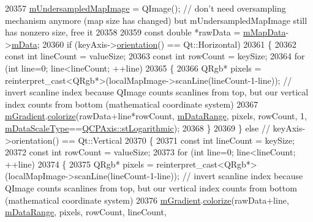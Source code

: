 \begin{DoxyCode}
20357     \hyperlink{class_q_c_p_color_map_acad3d52f3572436d5f2e4057911ea8d3}{mUndersampledMapImage} = QImage(); \textcolor{comment}{// don't need oversampling mechanism anymore
       (map size has changed) but mUndersampledMapImage still has nonzero size, free it}
20358   
20359   \textcolor{keyword}{const} \textcolor{keywordtype}{double} *rawData = \hyperlink{class_q_c_p_color_map_a8709272aa8f0be3ca111bf3866806f8b}{mMapData}->\hyperlink{class_q_c_p_color_map_data_ac1682862022f575191351c9825187d39}{mData};
20360   \textcolor{keywordflow}{if} (keyAxis->\hyperlink{class_q_c_p_axis_a57483f2f60145ddc9e63f3af53959265}{orientation}() == Qt::Horizontal)
20361   \{
20362     \textcolor{keyword}{const} \textcolor{keywordtype}{int} lineCount = valueSize;
20363     \textcolor{keyword}{const} \textcolor{keywordtype}{int} rowCount = keySize;
20364     \textcolor{keywordflow}{for} (\textcolor{keywordtype}{int} line=0; line<lineCount; ++line)
20365     \{
20366       QRgb* pixels = \textcolor{keyword}{reinterpret\_cast<}QRgb*\textcolor{keyword}{>}(localMapImage->scanLine(lineCount-1-line)); \textcolor{comment}{// invert scanline
       index because QImage counts scanlines from top, but our vertical index counts from bottom (mathematical
       coordinate system)}
20367       \hyperlink{class_q_c_p_color_map_aab77fe9a8df6f0486ab3507cc5f278fa}{mGradient}.\hyperlink{class_q_c_p_color_gradient_aaf423ceb943e177b0ed2c48c811d83dc}{colorize}(rawData+line*rowCount, \hyperlink{class_q_c_p_color_map_ab87609621d16cd3e9d52ad070b327b08}{mDataRange}, pixels, rowCount, 1,
       \hyperlink{class_q_c_p_color_map_ab28a4b2def408f83b9818799d5f18446}{mDataScaleType}==\hyperlink{class_q_c_p_axis_a36d8e8658dbaa179bf2aeb973db2d6f0abf5b785ad976618816dc6f79b73216d4}{QCPAxis::stLogarithmic});
20368     \}
20369   \} \textcolor{keywordflow}{else} \textcolor{comment}{// keyAxis->orientation() == Qt::Vertical}
20370   \{
20371     \textcolor{keyword}{const} \textcolor{keywordtype}{int} lineCount = keySize;
20372     \textcolor{keyword}{const} \textcolor{keywordtype}{int} rowCount = valueSize;
20373     \textcolor{keywordflow}{for} (\textcolor{keywordtype}{int} line=0; line<lineCount; ++line)
20374     \{
20375       QRgb* pixels = \textcolor{keyword}{reinterpret\_cast<}QRgb*\textcolor{keyword}{>}(localMapImage->scanLine(lineCount-1-line)); \textcolor{comment}{// invert scanline
       index because QImage counts scanlines from top, but our vertical index counts from bottom (mathematical
       coordinate system)}
20376       \hyperlink{class_q_c_p_color_map_aab77fe9a8df6f0486ab3507cc5f278fa}{mGradient}.\hyperlink{class_q_c_p_color_gradient_aaf423ceb943e177b0ed2c48c811d83dc}{colorize}(rawData+line, \hyperlink{class_q_c_p_color_map_ab87609621d16cd3e9d52ad070b327b08}{mDataRange}, pixels, rowCount, lineCount, 

\end{DoxyCode}
